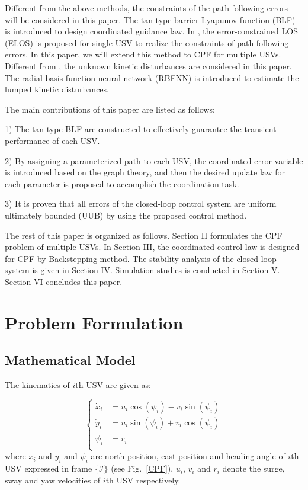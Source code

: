 \documentclass[conference,letterpaper,10.5pt]{IEEEtran}
\begin{document}
Different from the above methods, the constraints of the path following errors will be considered in this paper. The tan-type barrier Lyapunov function (BLF) is introduced to design coordinated guidance law. In \cite{bib11}, the error-constrained LOS (ELOS) is proposed for single USV to realize the constraints of path following errors. In this paper, we will extend this method to CPF for multiple USVs. Different from \cite{bib12}, the unknown kinetic disturbances are considered in this paper. The radial basis function neural network (RBFNN) is introduced to estimate the lumped kinetic disturbances. 

The main contributions of this paper are listed as follows:

1) The tan-type BLF are constructed to effectively guarantee the transient performance of each USV.

2) By assigning a parameterized path to each USV, the coordinated error variable is introduced based on the graph theory, and then the desired update law for each parameter is proposed to accomplish the coordination task.

3) It is proven that all errors of the closed-loop control system are uniform ultimately bounded (UUB) by using the proposed control method.

The rest of this paper is organized as follows. Section II formulates the CPF problem of multiple USVs. In Section III, the coordinated control law is designed for CPF by Backstepping method. The stability analysis of the closed-loop system is given in Section IV. Simulation studies is conducted in Section V. Section VI concludes this paper.


\section{Problem Formulation}
\subsection{Mathematical  Model}
The kinematics of $i$th USV are given as:

\begin{equation}\label{kinematics}
	\left\{
	\begin{aligned}
		\dot{x}_i&=u_i\cos(\psi_i)-v_i\sin(\psi_i)\\
		\dot{y}_i&=u_i\sin(\psi_i)+v_i\cos(\psi_i)\\
		\dot{\psi}_i&=r_i\\
	\end{aligned}
	\right.
\end{equation}
where $x_i$ and $y_i$ and $\psi_i$ are north position, east position and heading angle of $i$th USV expressed in frame $\{\mathcal{I}\}$ (see Fig.~\ref{CPF}), $u_i$, $v_i$ and $r_i$ denote the surge, sway and yaw velocities of $i$th USV respectively.
\end{document}
